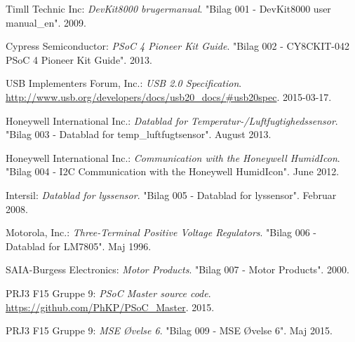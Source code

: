 \renewcommand{\bibname}{Litteraturliste}
\begin{thebibliography}{2}

 Timll Technic Inc: \textit{DevKit8000 brugermanual}. "Bilag 001 - DevKit8000 user manual\_en". 2009.

 Cypress Semiconductor: \textit{PSoC 4 Pioneer Kit Guide}. "Bilag 002 - CY8CKIT-042 PSoC 4 Pioneer Kit Guide". 2013.

 USB Implementers Forum, Inc.: \textit{USB 2.0 Specification}. \url{http://www.usb.org/developers/docs/usb20_docs/#usb20spec}. 2015-03-17.

 Honeywell International Inc.: \textit{Datablad for Temperatur-/Luftfugtighedssensor}. "Bilag 003 - Datablad for temp\_luftfugtsensor". August 2013.

 Honeywell International Inc.: \textit{\IIC Communication with the Honeywell HumidIcon}. "Bilag 004 - I2C Communication with the Honeywell HumidIcon". June 2012.

 Intersil: \textit{Datablad for lyssensor}. "Bilag 005 - Datablad for lyssensor". Februar 2008.

 Motorola, Inc.: \textit{Three-Terminal Positive Voltage Regulators}. "Bilag 006 - Datablad for LM7805". Maj 1996.

 SAIA-Burgess Electronics: \textit{Motor Products}. "Bilag 007 - Motor Products". 2000.

 PRJ3 F15 Gruppe 9: \textit{PSoC Master source code}. \url{https://github.com/PhKP/PSoC_Master}. 2015.

 PRJ3 F15 Gruppe 9: \textit{MSE Øvelse 6}. "Bilag 009 - MSE Øvelse 6". Maj 2015. %

\end{thebibliography}
